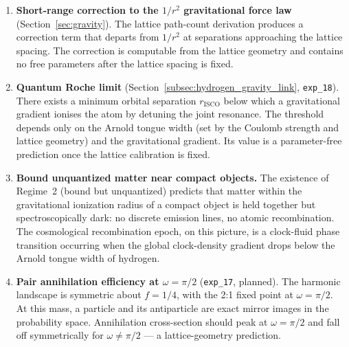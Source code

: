 \begin{enumerate}

\item \textbf{Short-range correction to the $1/r^2$ gravitational
force law} (Section~\ref{sec:gravity}).
The lattice path-count derivation produces a correction term that
departs from $1/r^2$ at separations approaching the lattice spacing.
The correction is computable from the lattice geometry and contains
no free parameters after the lattice spacing is fixed.

\item \textbf{Quantum Roche limit}
(Section~\ref{subsec:hydrogen_gravity_link}, \texttt{exp\_18}).
There exists a minimum orbital separation $r_\text{ISCO}$ below which
a gravitational gradient ionises the atom by detuning the joint
resonance.
The threshold depends only on the Arnold tongue width (set by the
Coulomb strength and lattice geometry) and the gravitational gradient.
Its value is a parameter-free prediction once the lattice calibration
is fixed.

\item \textbf{Bound unquantized matter near compact objects.}
The existence of Regime~2 (bound but unquantized) predicts that matter
within the gravitational ionization radius of a compact object is held
together but spectroscopically dark: no discrete emission lines,
no atomic recombination.
The cosmological recombination epoch, on this picture, is a clock-fluid
phase transition occurring when the global clock-density gradient drops
below the Arnold tongue width of hydrogen.

\item \textbf{Pair annihilation efficiency at $\omega = \pi/2$}
(\texttt{exp\_17}, planned).
The harmonic landscape is symmetric about $f = 1/4$, with the
2:1 fixed point at $\omega = \pi/2$.
At this mass, a particle and its antiparticle are exact mirror images
in the probability space.
Annihilation cross-section should peak at $\omega = \pi/2$ and fall
off symmetrically for $\omega \neq \pi/2$ --- a lattice-geometry
prediction.


\end{enumerate}
